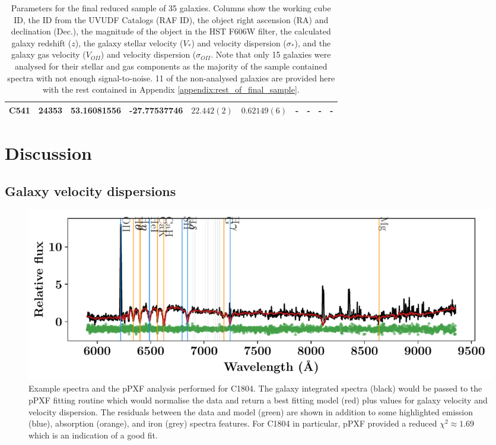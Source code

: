 \documentclass[12pt, twocolumn]{revtex4-1}    %
\begin{document}
\begin{table}
\begin{tabular}{c@{\hskip 10pt}c@{\hskip 10pt}c@{\hskip 10pt}c@{\hskip 10pt}c@{\hskip 10pt}c@{\hskip 10pt}c@{\hskip 10pt}c@{\hskip 10pt}c@{\hskip 10pt}c}
C541 & 24353 & 53.16081556 & -27.77537746 & $22.442(2)$ & $0.62149(6)$ & - & - & - & - \\ 
 \hline
\end{tabular}
\caption{Parameters for the final reduced sample of 35 galaxies. Columns show the working cube ID, the ID from the UVUDF Catalogs \citep{2015AJ....150...31R} (RAF ID), the object right ascension (RA) and declination (Dec.), the magnitude of the object in the HST F606W filter, the calculated galaxy redshift ($z$), the galaxy stellar velocity ($V_*$) and velocity dispersion ($\sigma_*$), and the galaxy gas velocity ($V_{OII}$) and velocity dispersion ($\sigma_{OII}$. Note that only 15 galaxies were analysed for their stellar and gas components as the majority of the sample contained spectra with not enough signal-to-noise. 11 of the non-analysed galaxies are provided here with the rest contained in Appendix \ref{appendix:rest_of_final_sample}.}
\label{table:final_sample}
\end{table}

\section{Discussion}

\subsection{Galaxy velocity dispersions}

\begin{figure}
\includegraphics[width=\textwidth]{data/cube_1804_spectra_complete}
\caption{Example spectra and the pPXF analysis performed for C1804. The galaxy integrated spectra (black) would be passed to the pPXF fitting routine which would normalise the data and return a best fitting model (red) plus values for galaxy velocity and velocity dispersion. The residuals between the data and model (green) are shown in addition to some highlighted emission (blue), absorption (orange), and iron (grey) spectra features. For C1804 in particular, pPXF provided a reduced $\chi^2 \approx 1.69$ which is an indication of a good fit.}
\label{fig:ppxf_spectra}
\end{figure}
\end{document}
